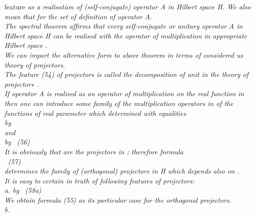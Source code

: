 \documentclass[a4paper,12pt] {article}
\begin{document}
{ feature  \coordHE{}    \it  as a  realisation  of (self-conjugate)  operator \rm  A  \it in Hilbert
 space \rm  H. We also mean that  \coordHE{} for the set of definition  \coordHE{} of operator
A.\\ \it The spectral theorem \rm affirms that  \it every self-conjugate or unitary operator \rm  A  \it in
Hilbert space \rm   H  \it  can be realised with the operator of multiplication in  appropriate Hilbert space \rm
{}\coordHE{}. \\ We  can impart the alternative form to above  theorem in  terms of considered
 us theory of projectors.\\ The feature (54) of  projectors is called  \it  the decomposition of unit \rm in
the theory of projectors .\\ If operator A is realised as an operator of multiplication on the \it  real \rm
function in \coordHE{}  then one can introduce  \it some family of the  multiplication
 operators \rm {}\coordHE{}  in \coordHE{}  \it of the functions of real parameter  \rm
\myHighlight{$ \lambda $}\coordHE{}  which determined with equalities \\\coordHE{} by \coordHE{} \\
and \\\coordHE{} by   \coordHE{}
\ (56)
\\ It is obviously that  \coordHE{} are the  \it projectors \rm in  \coordHE{} ; therefore
formula \\ \coordHE{} \ (57) \\ determines  \it the family of (orthogonal)
 projectors in \rm  H  \it which depends also on \rm  \myHighlight{$ \lambda $}\coordHE{}.\\ It is easy to certain in truth of
following features of projectors:\\
a. \coordHE{} by \myHighlight{$ \lambda \le \mu $}\coordHE{} \  (58a)\\ We obtain formula  (55) as its
 particular case for the  \it orthogonal projectors.\rm \\   b. }
\end{document}
